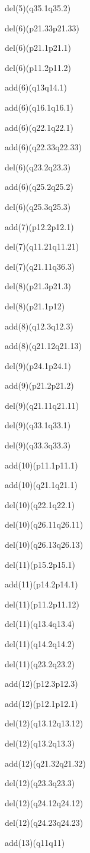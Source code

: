 \documentclass[]{article}
\begin{document}
del(5)(q35.1q35.2)

del(6)(p21.33p21.33)

del(6)(p21.1p21.1)

del(6)(p11.2p11.2)

add(6)(q13q14.1)

add(6)(q16.1q16.1)

add(6)(q22.1q22.1)

add(6)(q22.33q22.33)

del(6)(q23.2q23.3)

add(6)(q25.2q25.2)

del(6)(q25.3q25.3)

add(7)(p12.2p12.1)

del(7)(q11.21q11.21)

del(7)(q21.11q36.3)

del(8)(p21.3p21.3)

del(8)(p21.1p12)

add(8)(q12.3q12.3)

add(8)(q21.12q21.13)

del(9)(p24.1p24.1)

add(9)(p21.2p21.2)

del(9)(q21.11q21.11)

del(9)(q33.1q33.1)

del(9)(q33.3q33.3)

add(10)(p11.1p11.1)

add(10)(q21.1q21.1)

del(10)(q22.1q22.1)

del(10)(q26.11q26.11)

del(10)(q26.13q26.13)

del(11)(p15.2p15.1)

add(11)(p14.2p14.1)

del(11)(p11.2p11.12)

del(11)(q13.4q13.4)

del(11)(q14.2q14.2)

del(11)(q23.2q23.2)

add(12)(p12.3p12.3)

add(12)(p12.1p12.1)

del(12)(q13.12q13.12)

del(12)(q13.2q13.3)

add(12)(q21.32q21.32)

del(12)(q23.3q23.3)

del(12)(q24.12q24.12)

del(12)(q24.23q24.23)

add(13)(q11q11)
\end{document}
